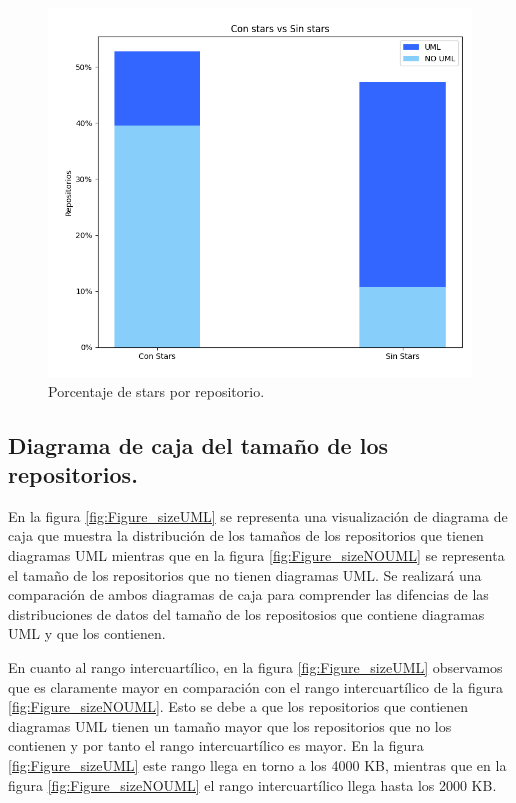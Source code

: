 \documentclass[a4paper, 12pt]{book}
\begin{document}
\begin{figure}
  \centering
  \includegraphics[width=12cm, keepaspectratio]{img/Figure_stars.png}
  \caption{Porcentaje de stars por repositorio.}\label{fig:Figure_stars}
\end{figure}


\subsection{Diagrama de caja del tamaño de los repositorios.}
\label{sec:Diagrama de caja del tamaño de los repositorios}
En la figura \ref{fig:Figure_sizeUML} se representa una visualización de diagrama de caja que muestra la distribución de los tamaños de los repositorios que tienen diagramas UML 
mientras que en la figura \ref{fig:Figure_sizeNOUML} se representa el tamaño de los repositorios que no tienen diagramas UML.
Se realizará una comparación de ambos diagramas de caja para comprender las difencias de las distribuciones de datos del tamaño de los repositosios que contiene diagramas UML y que los contienen.
 

En cuanto al rango intercuartílico, en la figura \ref{fig:Figure_sizeUML} observamos que es claramente mayor en comparación con el rango intercuartílico de la figura \ref{fig:Figure_sizeNOUML}.
Esto se debe a que los repositorios que contienen diagramas UML tienen un tamaño mayor que los repositorios que no los contienen y por tanto el rango intercuartílico es mayor.
En la figura \ref{fig:Figure_sizeUML} este rango llega en torno a los 4000 KB, mientras que en la figura \ref{fig:Figure_sizeNOUML} el rango intercuartílico llega hasta los 2000 KB.
\end{document}
